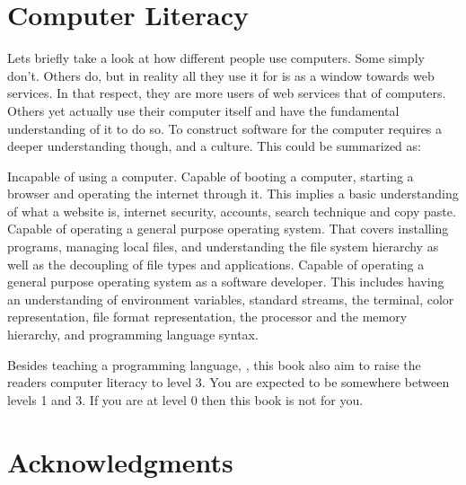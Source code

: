 \section{Computer Literacy}

Lets briefly take a look at how different people use computers. Some simply don't. Others do, but in reality all they use it for is as a window towards web services. In that respect, they are more users of web services that of computers. Others yet actually use their computer itself and have the fundamental understanding of it to do so. To construct software for the computer requires a deeper understanding though, and a culture. This could be summarized as:

\begin{itemize}
   Incapable of using a computer.
   Capable of booting a computer, starting a browser and operating the internet through it. This implies a basic understanding of what a website is, internet security, accounts, search technique and copy paste.
   Capable of operating a general purpose operating system. That covers installing programs, managing local files, and understanding the file system hierarchy as well as the decoupling of file types and applications.
   Capable of operating a general purpose operating system as a software developer. This includes having an understanding of environment variables, standard streams, the terminal, color representation, file format representation, the processor and the memory hierarchy, and programming language syntax.
\end{itemize}

Besides teaching a programming language, \csharp, this book also aim to raise the readers computer literacy to level 3. You are expected to be somewhere between levels 1 and 3. If you are at level 0 then this book is not for you.

\section{Acknowledgments}
